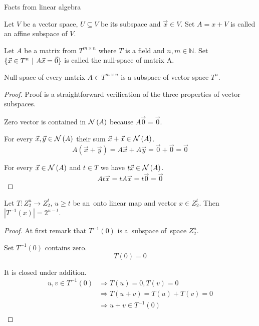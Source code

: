 \begin{chapter}{Facts from linear algebra}
\begin{definition}
Let $V$ be a vector space, $U \subseteq V$ be its subspace and $\vec{x} \in V$. Set $A = x + V$ is called an affine subspace of $V$.
\end{definition}

\begin{definition}
Let $A$ be a matrix from $T ^ {m \times n}$ where $T$ is a field and $n, m \in \mathbb{N}$. Set $\{ \vec{x} \in T^{n} \ | \  A\vec{x} = \vec{0} \}$ is called the null-space of matrix A.
\end{definition}

\begin{remark}
Null-space of every matrix $A \in T ^ {m \times n}$ is a subspace of vector space $T^{n}$.
\end{remark}
\begin{proof}
Proof is a straightforward verification of the three properties of vector subspaces.

Zero vector is contained in $\mathcal{N}\left({A}\right)$ because $A\vec{0} = \vec{0}$.

For every $\vec{x}, \vec{y} \in \mathcal{N}\left({A}\right)$ their sum $\vec{x} + \vec{x} \in \mathcal{N}\left({A}\right)$.
\[
	A(\vec{x} + \vec{y}) = A\vec{x} + A\vec{y} = \vec{0} + \vec{0} = \vec{0}
\]

For every $\vec{x} \in \mathcal{N}\left({A}\right)$ and $t \in T$ we have $t \vec{x} \in \mathcal{N}\left({A}\right)$.
\[
	At\vec{x} = tA\vec{x} = t\vec{0} = \vec{0}
\]
\end{proof}

\begin{lemma}
\label{lemma-linear-transformation-domain-distribution}
Let $T: Z_2^u \rightarrow Z_2^t$, $u \geq t$ be an~onto linear map and vector $x \in Z_2^t$. Then $|T^{-1}(x)| = 2 ^ {u-t}$.
\end{lemma}
\begin{proof}
At first remark that $T^{-1}(0)$ is a~subspace of~space $Z_2^u$.

Set $T^{-1}(0)$ contains zero.
\[ T(0) = 0 \]

It is closed under addition.
\[
\begin{split}
u, v \in T^{-1}(0) 
	& \Rightarrow T(u) = 0, T(v) = 0 \\ 
	& \Rightarrow T(u + v) = T(u) + T(v) = 0 \\ 
	& \Rightarrow u + v \in T^{-1}(0) \\
\end{split}
\]


\end{proof}
\end{chapter}
